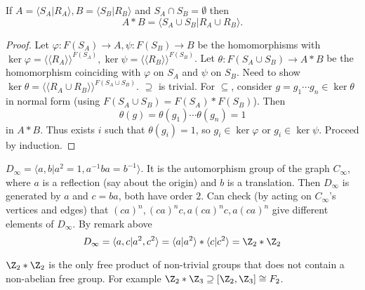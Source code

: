 \documentclass[a4paper]{article}
\begin{document}
\begin{theorem}
  If \(A = \langle S_A|R_A \rangle, B = \langle S_B|R_B \rangle\) and \(S_A \cap S_B = \emptyset\) then
  \[
    A * B = \langle S_A \cup S_B| R_A \cup R_B \rangle.
  \]
\end{theorem}

\begin{proof}
  Let \(\varphi: F(S_A) \to A, \psi: F(S_B) \to B\) be the homomorphisms with \(\ker \varphi = \langle\langle R_A \rangle\rangle^{F(S_A)}, \ker \psi = \langle\langle R_B \rangle\rangle^{F(S_B)}\). Let \(\theta: F(S_A \cup S_B) \to A * B\) be the homomorphism coinciding with \(\varphi\) on \(S_A\) and \(\psi\) on \(S_B\). Need to show \(\ker \theta = \langle\langle R_A \cup R_B \rangle\rangle^{F(S_A \cup S_B)}\). \(\supseteq\) is trivial. For \(\subseteq\), consider \(g = g_1 \cdots g_n \in \ker \theta\) in normal form (using \(F(S_A \cup S_B) = F(S_A) * F(S_B)\)). Then
  \[
    \theta(g) = \theta(g_1) \cdots \theta(g_n) = 1
  \]
  in \(A * B\). Thus exists \(i\) such that \(\theta(g_i) = 1\), so \(g_i \in \ker \varphi\) or \(g_i \in \ker \psi\). Proceed by induction.
\end{proof}

\begin{eg}
  \(D_\infty = \langle a, b| a^2 = 1, a^{-1}ba = b^{-1} \rangle\). It is the automorphism group of the graph \(C_\infty\), where \(a\) is a reflection (say about the origin) and \(b\) is a translation. Then \(D_\infty\) is generated by \(a\) and \(c = ba\), both have order \(2\). Can check (by acting on \(C_\infty\)'s vertices and edges) that \((ca)^n, (ca)^n c, a(ca)^n c, a (ca)^n\) give different elements of \(D_\infty\). By remark above
  \[
    D_\infty
    = \langle a, c| a^2, c^2\rangle
    = \langle a|a^2 \rangle * \langle c|c^2 \rangle
    = \Z_2 * \Z_2
  \]
\end{eg}

\begin{remark}
  \(\Z_2 * \Z_2\) is the only free product of non-trivial groups that does not contain a non-abelian free group. For example \(\Z_2 * \Z_3 \supseteq [\Z_2, \Z_3] \cong F_2\).
\end{remark}





\printindex
\end{document}

